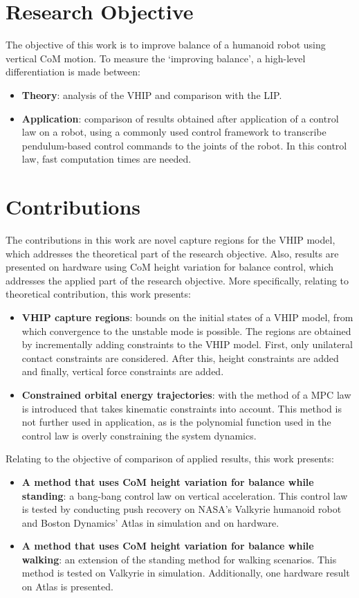 \section{Research Objective}
The objective of this work is to improve balance of a humanoid robot using vertical \ac{CoM} motion. To measure the `improving balance', a high-level differentiation is made between:
\begin{itemize}
	\item \textbf{Theory}: analysis of the \ac{VHIP} and comparison with the \ac{LIP}.
	\item \textbf{Application}: comparison of results obtained after application of a control law on a robot, using a commonly used control framework to transcribe pendulum-based control commands to the joints of the robot. In this control law, fast computation times are needed.
\end{itemize}

\section{Contributions}
The contributions in this work are novel capture regions for the \ac{VHIP} model, which addresses the theoretical part of the research objective. Also, results are presented on hardware using \ac{CoM} height variation for balance control, which addresses the applied part of the research objective. More specifically, relating to theoretical contribution, this work presents:
\begin{itemize}
	\item \textbf{\ac{VHIP} capture regions}: bounds on the initial states of a \ac{VHIP} model, from which convergence to the unstable mode is possible. The regions are obtained by incrementally adding constraints to the \ac{VHIP} model. First, only unilateral contact constraints are considered. After this, height constraints are added and finally, vertical force constraints are added.
      \item \textbf{Constrained orbital energy trajectories}: with the method of \cite{koolen2016balance} a \ac{MPC} law is introduced that takes kinematic constraints into account. This method is not further used in application, as is the polynomial function used in the control law is overly constraining the system dynamics.
\end{itemize}

Relating to the objective of comparison of applied results, this work presents:
\begin{itemize}
	\item \textbf{A method that uses \ac{CoM} height variation for balance while standing}: a bang-bang control law on vertical acceleration. This control law is tested by conducting push recovery on NASA's Valkyrie humanoid robot and Boston Dynamics' Atlas in simulation and on hardware.
	\item \textbf{A method that uses \ac{CoM} height variation for balance while walking}: an extension of the standing method for walking scenarios. This method is tested on Valkyrie in simulation. Additionally, one hardware result on Atlas is presented.
\end{itemize}
